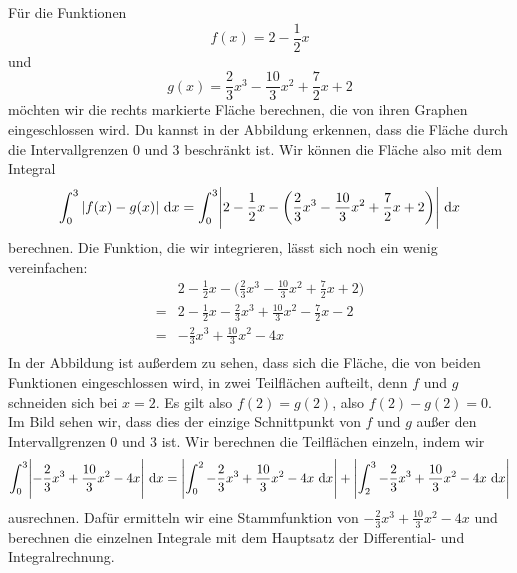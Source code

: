 \documentclass[../../main.tex]{subfiles}
\begin{document}
\begin{example}{}
    Für die Funktionen \[f(x)=2-\frac{1}{2}x\] 
    und 
    \[g(x)=\frac{2}{3}x^3-\frac{10}{3}x^2+\frac{7}{2}x+2\] 
    möchten wir die rechts markierte Fläche berechnen, die von ihren Graphen eingeschlossen wird. 
    Du kannst in der Abbildung erkennen, dass die Fläche durch die Intervallgrenzen $0$ und $3$ beschränkt ist.
    Wir können die Fläche also mit dem Integral
    \[\int_0^3|f(x)-g(x)|\mathop{}\mathrm{d} x=\int_0^3\Biggl|2-\frac{1}{2}x-\biggl(\frac{2}{3}x^3-\frac{10}{3}x^2+\frac{7}{2}x+2\biggr)\Biggr|\mathop{}\mathrm{d} x\]
    berechnen. Die Funktion, die wir integrieren, lässt sich noch ein wenig vereinfachen:
    \begin{align*}
        &2-\frac{1}{2}x-\biggl(\frac{2}{3}x^3-\frac{10}{3}x^2+\frac{7}{2}x+2\biggr)\\
        =&2-\frac{1}{2}x-\frac{2}{3}x^3+\frac{10}{3}x^2-\frac{7}{2}x-2\\
        =&-\frac{2}{3}x^3+\frac{10}{3}x^2-4x\\
    \end{align*}
    In der Abbildung ist außerdem zu sehen, dass sich die Fläche, die von beiden Funktionen eingeschlossen wird, in zwei
    Teilflächen aufteilt, denn $f$ und $g$ schneiden sich bei $x=2$. Es gilt also $f(2)=g(2)$, also $f(2)-g(2)=0$. Im
    Bild sehen wir, dass dies der einzige Schnittpunkt von $f$ und $g$ außer den Intervallgrenzen $0$ und $3$ ist.
    Wir berechnen die Teilflächen einzeln, indem wir
    \[\int_0^3\Biggl|-\frac{2}{3}x^3+\frac{10}{3}x^2-4x\Biggr|\mathop{}\mathrm{d} x=\Biggl|\int_0^2-\frac{2}{3}x^3+\frac{10}{3}x^2-4x\mathop{}\mathrm{d} x\Biggr|+\Biggl|\int_2^3-\frac{2}{3}x^3+\frac{10}{3}x^2-4x\mathop{}\mathrm{d} x\Biggr|\]
    ausrechnen. Dafür ermitteln wir eine Stammfunktion von $-\frac{2}{3}x^3+\frac{10}{3}x^2-4x$ und berechnen die einzelnen
    Integrale mit dem Hauptsatz der Differential- und Integralrechnung.
\end{example}
\end{document}
